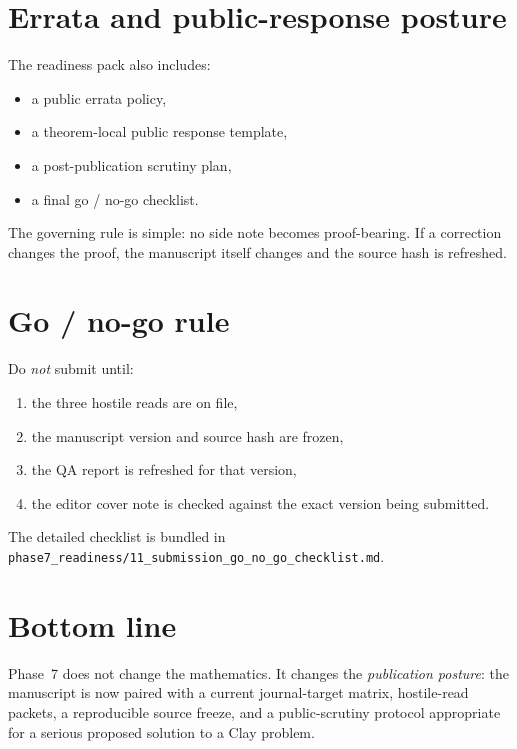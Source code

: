 \documentclass[11pt]{article}
\begin{document}
\section{Errata and public-response posture}
The readiness pack also includes:
\begin{itemize}[leftmargin=1.5em]
\item a public errata policy,
\item a theorem-local public response template,
\item a post-publication scrutiny plan,
\item a final go / no-go checklist.
\end{itemize}
The governing rule is simple: no side note becomes proof-bearing. If a correction changes the proof, the manuscript itself changes and the source hash is refreshed.

\section{Go / no-go rule}
Do \emph{not} submit until:
\begin{enumerate}[leftmargin=1.5em]
\item the three hostile reads are on file,
\item the manuscript version and source hash are frozen,
\item the QA report is refreshed for that version,
\item the editor cover note is checked against the exact version being submitted.
\end{enumerate}
The detailed checklist is bundled in \texttt{phase7\_readiness/11\_submission\_go\_no\_go\_checklist.md}.

\section*{Bottom line}
Phase~7 does not change the mathematics. It changes the \emph{publication posture}: the manuscript is now paired with a current journal-target matrix, hostile-read packets, a reproducible source freeze, and a public-scrutiny protocol appropriate for a serious proposed solution to a Clay problem.
\end{document}
